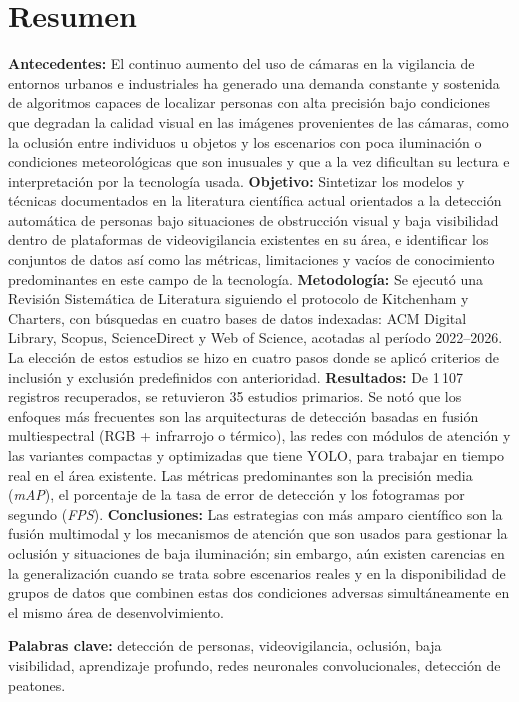 \documentclass[12pt, a4paper]{article}
\begin{document}
\section*{Resumen}
\noindent
\textbf{Antecedentes:} El continuo aumento del uso de cámaras en la
vigilancia de entornos urbanos e industriales ha generado una
demanda constante y sostenida de algoritmos capaces de localizar
personas con alta precisión bajo condiciones que degradan la calidad
visual en las imágenes provenientes de las cámaras, como la oclusión entre individuos u
objetos y los escenarios con poca iluminación o condiciones
meteorológicas que son inusuales y que a la vez dificultan su lectura e interpretación por la tecnología usada.
\textbf{Objetivo:} Sintetizar los modelos y técnicas documentados
en la literatura científica actual orientados a la detección
automática de personas bajo situaciones de obstrucción visual y
baja visibilidad dentro de plataformas de videovigilancia existentes en su área, e identificar
los conjuntos de datos así como las métricas, limitaciones y vacíos de
conocimiento predominantes en este campo de la tecnología.
\textbf{Metodología:} Se ejecutó una Revisión Sistemática de
Literatura siguiendo el protocolo de Kitchenham y
Charters, con búsquedas en cuatro bases de
datos indexadas: ACM Digital Library, Scopus, ScienceDirect y Web of
Science, acotadas al período 2022--2026. La elección de estos
estudios se hizo en cuatro pasos donde se aplicó criterios de
inclusión y exclusión predefinidos con anterioridad.
\textbf{Resultados:} De 1\,107 registros recuperados, se retuvieron
35 estudios primarios. Se notó que los enfoques más frecuentes son las
arquitecturas de detección basadas en fusión multiespectral
(RGB + infrarrojo o térmico), las redes con módulos de
atención y las variantes compactas y optimizadas que tiene YOLO, para trabajar en tiempo
real en el área existente. Las métricas predominantes son la precisión media
(\textit{mAP}), el porcentaje de la tasa de error de detección y los fotogramas
por segundo (\textit{FPS}).
\textbf{Conclusiones:} Las estrategias con más amparo científico son la fusión multimodal y los mecanismos de atención que son usados
para gestionar la oclusión y situaciones de baja iluminación; sin embargo, aún
existen carencias en la generalización cuando se trata sobre escenarios reales y en
la disponibilidad de grupos de datos que combinen estas dos condiciones
adversas simultáneamente en el mismo área de desenvolvimiento.

\vspace{0.4em}
\noindent\textbf{Palabras clave:} detección de personas,
videovigilancia, oclusión, baja visibilidad, aprendizaje profundo,
redes neuronales convolucionales, detección de peatones.
\end{document}
